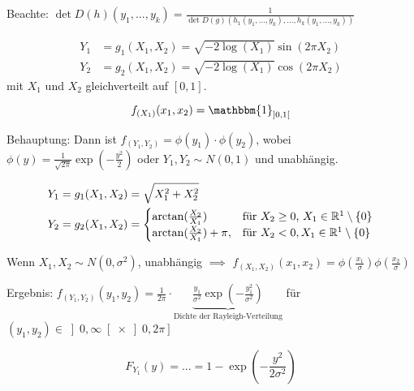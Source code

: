 \documentclass{cheat-sheet}
\newcommand{\ind}{\mathbbm{1}} %
\begin{document}
Beachte: $\det D(h)(y_1, ..., y_k) = \frac{1}{\det D(g)(h_1(y_1, ..., y_k), ..., h_k(y_1, ..., y_k))}$

\begin{bsp}

  \begin{align*}
    Y_1 &= g_1(X_1, X_2) = \sqrt{- 2 \log (X_1)} \sin(2 \pi X_2) \\
    Y_2 &= g_2(X_1, X_2) = \sqrt{- 2 \log (X_1)} \cos(2 \pi X_2)
  \end{align*}
  mit $X_1$ und $X_2$ gleichverteilt auf $[0,1]$.

  \[ f_{(X_1)}(x_1, x_2) = \ind_{\left] 0,1 \right[} \]

  Behauptung: Dann ist $f_{(Y_1, Y_2)} = \phi(y_1) \cdot \phi(y_2)$, wobei $\phi(y) = \frac{1}{\sqrt{2 \pi}} \exp(- \frac{y^2}{2})$ oder $Y_1, Y_2 \sim N(0, 1)$ und unabhängig.
\end{bsp}

\begin{bsp}
  \begin{align*}
    Y_1 &= g_1(X_1, X_2) = \sqrt{X_1^2 + X_2^2} \\
    Y_2 &= g_2(X_1, X_2) = \begin{cases} \arctan(\frac{X_2}{X_1}) & \text{für $X_2 \geq 0$, $X_1 \in \mathbb{R}^1 \setminus \{ 0 \}$} \\ \arctan(\frac{X_2}{X_1}) + \pi, & \text{für } X_2 < 0, X_1 \in \mathbb{R}^1 \setminus \{ 0 \} \end{cases}
  \end{align*}

  Wenn $X_1, X_2 \sim N(0, \sigma^2)$, unabhängig $\implies$ $f_{(X_1, X_2)}(x_1, x_2) = \phi(\frac{x_1}{\sigma}) \phi(\frac{x_2}{\sigma})$

  Ergebnis: $f_{(Y_1, Y_2)}(y_1, y_2) = \frac{1}{2 \pi} \cdot \underbrace{\frac{y_1}{\sigma^2} \exp(- \frac{y_1^2}{\sigma^2})}_{\text{Dichte der Rayleigh-Verteilung}}$ für $(y_1, y_2) \in \left] 0, \infty \right[ \times \left] 0, 2\pi \right]$

  \[ F_{Y_1}(y) = ... = 1 - \exp(- \frac{y^2}{2 \sigma^2}) \]
\end{bsp}
\end{document}
